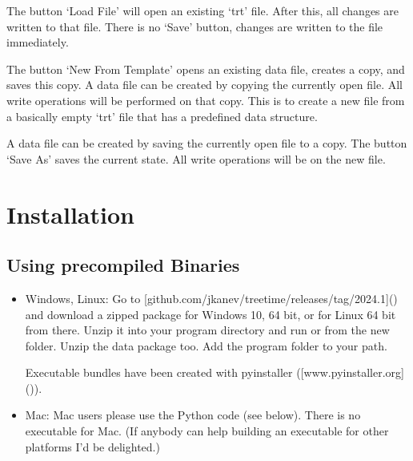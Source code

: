 \documentclass[letterpaper,10pt,english]{sphinxmanual}
\begin{document}
\sphinxAtStartPar
The button ‘Load File’ will open an existing ‘trt’ file. After this, all changes are written to that file. There is no ‘Save’ button, changes are written to the file immediately.

\sphinxAtStartPar
The button ‘New From Template’ opens an existing data file, creates a copy, and saves this copy. A data file can be created by copying the currently open file. All write operations will be performed on that copy. This is to create a new file from a basically empty ‘trt’ file that has a pre\sphinxhyphen{}defined data structure.

\sphinxAtStartPar
A data file can be created by saving the currently open file to a copy. The button ‘Save As’ saves the current state. All write operations will be on the new file.


\section{Installation}
\label{\detokenize{introduction:installation}}

\subsection{Using pre\sphinxhyphen{}compiled Binaries}
\label{\detokenize{introduction:using-pre-compiled-binaries}}\begin{itemize}
\item {} 
\sphinxAtStartPar
Windows, Linux: Go to {[}github.com/jkanev/treetime/releases/tag/2024.1{]}() and download a zipped package for Windows 10, 64 bit, or for Linux 64 bit from there. Unzip it into your program directory and run  or  from the new folder. Unzip the data package too. Add the program folder to your path.

\sphinxAtStartPar
Executable bundles have been created with pyinstaller ({[}www.pyinstaller.org{]}()).

\item {} 
\sphinxAtStartPar
Mac: Mac users please use the Python code (see below). There is no executable for Mac.
(If anybody can help building an executable for other platforms I’d be delighted.)

\end{itemize}
\end{document}
